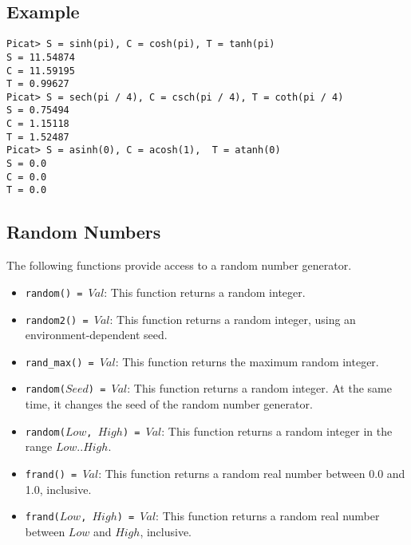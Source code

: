 \subsection*{Example}
\begin{verbatim}
Picat> S = sinh(pi), C = cosh(pi), T = tanh(pi)
S = 11.54874
C = 11.59195
T = 0.99627
Picat> S = sech(pi / 4), C = csch(pi / 4), T = coth(pi / 4)
S = 0.75494
C = 1.15118
T = 1.52487
Picat> S = asinh(0), C = acosh(1),  T = atanh(0)
S = 0.0
C = 0.0
T = 0.0
\end{verbatim}

\subsection{Random Numbers}
The following functions provide access to a random number generator.
\begin{itemize}
\item \texttt{random() = $Val$}: This function returns a random integer.
\item \texttt{random2() = $Val$}: This function returns a random integer, using an environment-dependent seed.
\item \texttt{rand\_max() = $Val$}: This function returns the maximum random integer.
\item \texttt{random($Seed$) = $Val$}: This function returns a random integer.  At the same time, it changes the seed of the random number generator.
\item \texttt{random($Low$, $High$) = $Val$}: This function returns a random integer in the range $Low$..$High$.
\item \texttt{frand() = $Val$}: This function returns a random real number between 0.0 and 1.0, inclusive.
\item \texttt{frand($Low$, $High$) = $Val$}: This function returns a random real number between $Low$ and $High$, inclusive.

\end{itemize}

